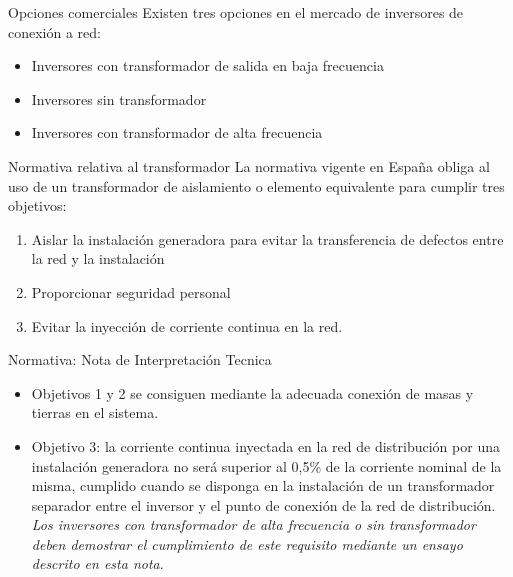 \documentclass[xcolor={usenames,svgnames,dvipsnames}]{beamer}
\begin{document}
\begin{frame}[label=sec-2-5-5]{Opciones comerciales}
Existen tres opciones en el mercado de inversores de conexión a red:

\begin{itemize}
\item Inversores con transformador de salida en baja frecuencia

\item Inversores sin transformador

\item Inversores con transformador de alta frecuencia
\end{itemize}
\end{frame}

\begin{frame}[label=sec-2-5-6]{Normativa relativa al transformador}
La normativa vigente en España obliga al uso de un transformador de aislamiento o elemento equivalente para cumplir tres objetivos:

\begin{enumerate}
\item Aislar la instalación generadora para evitar la transferencia de defectos entre la red y la instalación

\item Proporcionar seguridad personal

\item Evitar la inyección de corriente continua en la red.
\end{enumerate}
\end{frame}

\begin{frame}[label=sec-2-5-7]{Normativa: Nota de Interpretación Tecnica}
\begin{itemize}
\item Objetivos 1 y 2 se consiguen mediante la adecuada conexión de masas y tierras en el sistema.

\item Objetivo 3: \guillemotleft{}\alert{la corriente continua inyectada en la red de distribución por una instalación generadora no será superior al 0,5\% de la corriente nominal de la misma}\guillemotright{}, cumplido \guillemotleft{}\alert{cuando se disponga en la instalación de un transformador separador entre el inversor y el punto de conexión de la red de distribución}\guillemotright{}. \emph{Los inversores con transformador de alta frecuencia o sin transformador deben demostrar el cumplimiento de este requisito mediante un ensayo descrito en esta nota}.
\end{itemize}
\end{frame}
\end{document}
